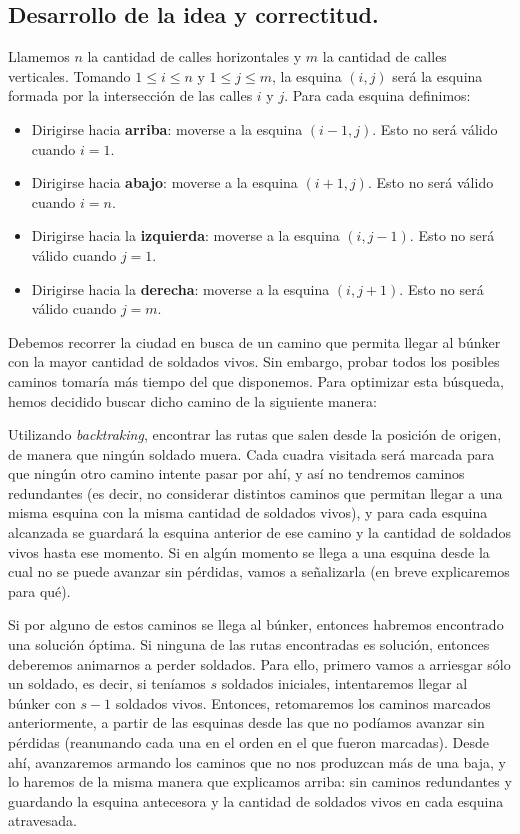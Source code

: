 \vspace*{0.6cm}

\subsection{Desarrollo de la idea y correctitud.}

\vspace*{0.3cm}

Llamemos $n$ la cantidad de calles horizontales y $m$ la cantidad de calles verticales.  Tomando $1 \leq i \leq n$ y $1 \leq j \leq m$, la esquina $(i,j)$ será la esquina formada por la intersección de las calles $i$ y $j$.  Para cada esquina definimos:

\begin{itemize}
	\item Dirigirse hacia {\bf arriba}: moverse a la esquina $(i-1,j)$. Esto no será válido cuando $i = 1$.
	\item Dirigirse hacia {\bf abajo}: moverse a la esquina $(i+1,j)$. Esto no será válido cuando $i = n$.
	\item Dirigirse hacia la {\bf izquierda}: moverse a la esquina $(i,j-1)$. Esto no será válido cuando $j = 1$.
	\item Dirigirse hacia la {\bf derecha}: moverse a la esquina $(i,j+1)$. Esto no será válido cuando $j = m$.
\end{itemize}

Debemos recorrer la ciudad en busca de un camino que permita llegar al búnker con la mayor cantidad de soldados vivos.  Sin embargo, probar todos los posibles caminos tomaría más tiempo del que disponemos.  Para optimizar esta búsqueda, hemos decidido buscar dicho camino de la siguiente manera:

Utilizando {\it backtraking}, encontrar las rutas que salen desde la posición de origen, de manera que ningún soldado muera.  Cada cuadra visitada será marcada para que ningún otro camino intente pasar por ahí, y así no tendremos caminos redundantes (es decir, no considerar distintos caminos que permitan llegar a una misma esquina con la misma cantidad de soldados vivos), y para cada esquina alcanzada se guardará la esquina anterior de ese camino y la cantidad de soldados vivos hasta ese momento.  Si en algún momento se llega a una esquina desde la cual no se puede avanzar sin pérdidas, vamos a señalizarla (en breve explicaremos para qué). 

Si por alguno de estos caminos se llega al búnker, entonces habremos encontrado una solución óptima.  Si ninguna de las rutas encontradas es solución, entonces deberemos animarnos a perder soldados.  Para ello, primero vamos a arriesgar sólo un soldado, es decir, si teníamos $s$ soldados iniciales, intentaremos llegar al búnker con $s-1$ soldados vivos. Entonces, retomaremos los caminos marcados anteriormente, a partir de las esquinas desde las que no podíamos avanzar sin pérdidas (reanunando cada una en el orden en el que fueron marcadas).  Desde ahí, avanzaremos armando los caminos que no nos produzcan más de una baja, y lo haremos de la misma manera que explicamos arriba: sin caminos redundantes y guardando la esquina antecesora y la cantidad de soldados vivos en cada esquina atravesada. 


